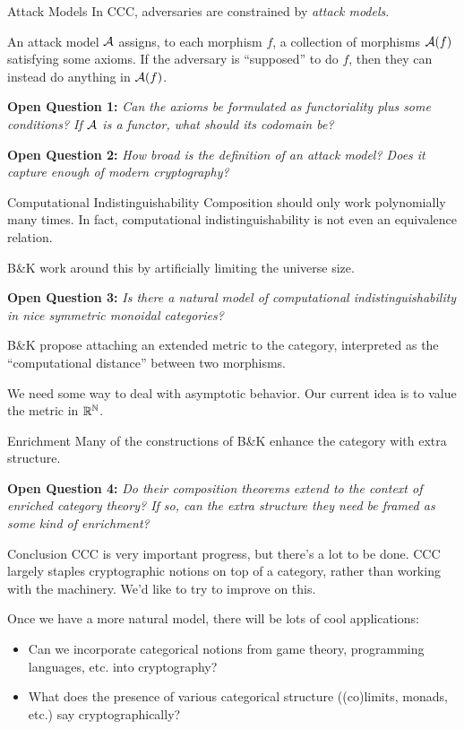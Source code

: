 \documentclass{beamer}
\begin{document}
\begin{frame}{Attack Models}
	In CCC, adversaries are constrained by \emph{attack models}.\pause

	An attack model $\mathcal{A}$ assigns, to each morphism $f$, a collection of morphisms
	$\mathcal{A}(f)$ satisfying some axioms. If the adversary is ``supposed'' to do $f$,
	then they can instead do anything in $\mathcal{A}(f)$.\pause

	\textbf{Open Question 1:} \emph{Can the axioms be formulated as functoriality plus
		some conditions? If $\mathcal{A}$ is a functor, what should its codomain be?}\pause

	\textbf{Open Question 2:} \emph{How broad is the definition of an attack
		model? Does it capture enough of modern cryptography?}
\end{frame}

\begin{frame}{Computational Indistinguishability}
	Composition should only work polynomially many times.\pause{} In fact,
	computational indistinguishability is not even an equivalence relation.\pause

	B\&K work around this by artificially limiting the universe size.\pause

	\textbf{Open Question 3:} \emph{Is there a natural model of computational
		indistinguishability in nice symmetric monoidal categories?}\pause

	B\&K propose attaching an extended metric to the category, interpreted as
	the ``computational distance'' between two morphisms.\pause

	We need some way to deal with asymptotic behavior. Our current idea is to
	value the metric in $\mathbb{R}^{\mathbb{N}}$.
\end{frame}

\begin{frame}{Enrichment}
	Many of the constructions of B\&K enhance the category with extra
	structure.\pause{}

	\textbf{Open Question 4:} \emph{Do their composition theorems extend to the context of
		enriched category theory?\pause{} If so, can the extra structure they need be framed
		as some kind of enrichment?}
\end{frame}

\begin{frame}{Conclusion}
	CCC is very important progress, but there's a lot to be done.\pause{} CCC
	largely staples cryptographic notions on top of a category, rather than working
	with the machinery. We'd like to try to improve on this.\pause

	Once we have a more natural model, there will be lots of cool applications:\pause
	\begin{itemize}
		\item Can we incorporate categorical notions from game theory, programming
		      languages, etc. into cryptography?\pause
		\item What does the presence of various categorical structure ((co)limits,
		      monads, etc.) say cryptographically?
	\end{itemize}
\end{frame}
\end{document}
